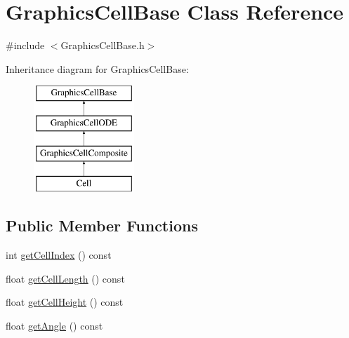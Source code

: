 \hypertarget{class_graphics_cell_base}{\section{\-Graphics\-Cell\-Base \-Class \-Reference}
\label{class_graphics_cell_base}
}


{\ttfamily \#include $<$\-Graphics\-Cell\-Base.\-h$>$}

\-Inheritance diagram for \-Graphics\-Cell\-Base\-:\begin{figure}[H]
\begin{center}
\leavevmode
\includegraphics[height=4.000000cm]{class_graphics_cell_base}
\end{center}
\end{figure}
\subsection*{\-Public \-Member \-Functions}
\begin{DoxyCompactItemize}
\item 
int \hyperlink{class_graphics_cell_base_aaf51239fcc44325ad9cb828b96424033}{get\-Cell\-Index} () const 
\item 
float \hyperlink{class_graphics_cell_base_a0c638650a9cdbe65efdca7385d6f7454}{get\-Cell\-Length} () const 
\item 
float \hyperlink{class_graphics_cell_base_ab0a62023e5599c721fc4d6cad341785f}{get\-Cell\-Height} () const 
\item 
float \hyperlink{class_graphics_cell_base_ae9ce129f8462b6d05d9b52e504db27cf}{get\-Angle} () const 
\end{DoxyCompactItemize}
